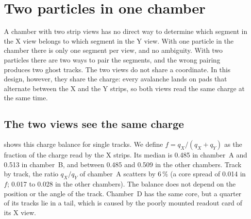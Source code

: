 \section{Two particles in one chamber}\label{sec:twoparticle}

A chamber with two strip views has no direct way to determine which segment in the X view belongs to which segment in
the Y view. With one particle in the chamber there is only one segment per view, and no ambiguity. With two particles
there are two ways to pair the segments, and the wrong pairing produces two ghost tracks. The two views do not share a
coordinate. In this design, however, they share the charge: every avalanche lands on pads that alternate between the X
and the Y strips, so both views read the same charge at the same time.

\subsection{The two views see the same charge}\label{sec:balance}
 shows this charge balance for single tracks. We define $f=q_X/(q_X+q_Y)$ as the fraction of the
charge read by the X strips. Its median is 0.485 in chamber~A and 0.513 in chamber~B, and between 0.485 and 0.509 in
the other chambers. Track by track, the ratio $q_X/q_Y$ of chamber~A scatters by 6\,\% (a core spread of 0.014 in $f$;
0.017 to 0.028 in the other chambers). The balance does not depend on the position or the angle of the track.
Chamber~D has the same core, but a quarter of its tracks lie in a tail, which is caused by the poorly mounted readout card
of its X view.

